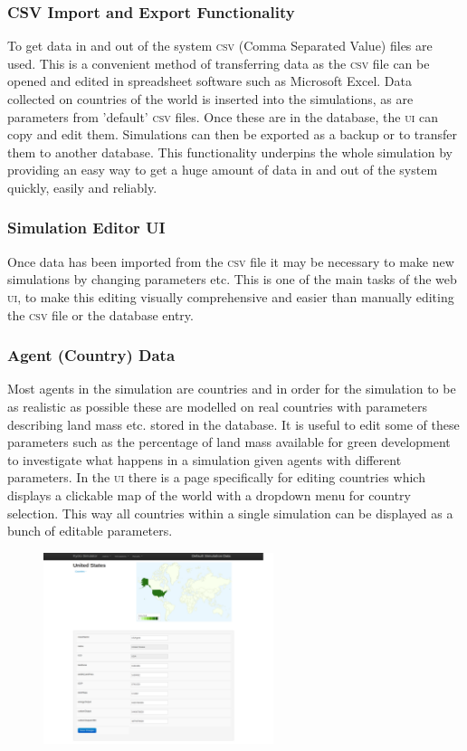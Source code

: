 {\subsubsection{CSV Import and Export Functionality}

To get data in and out of the system \textsc{csv} (Comma Separated Value) files are used. This is a convenient method of transferring data as the \textsc{csv} file can be opened and edited in spreadsheet software such as Microsoft Excel. Data collected on countries of the world is inserted into the simulations, as are parameters from 'default' \textsc{csv} files. Once these are in the database, the \textsc{ui} can copy and edit them. Simulations can then be exported as a backup or to transfer them to another database. This functionality underpins the whole simulation by providing an easy way to get a huge amount of data in and out of the system quickly, easily and reliably.

\subsubsection{Simulation Editor UI}

Once data has been imported from the \textsc{csv} file it may be necessary to make new simulations by changing parameters etc. This is one of the main tasks of the web \textsc{ui}, to make this editing visually comprehensive and easier than manually editing the \textsc{csv} file or the database entry.

\subsubsection{Agent (Country) Data}

Most agents in the simulation are countries and in order for the simulation to be as realistic as possible these are modelled on real countries with parameters describing land mass etc. stored in the database. It is useful to edit some of these parameters such as the percentage of land mass available for green development to investigate what happens in a simulation given agents with different parameters. In the \textsc{ui} there is a page specifically for editing countries which displays a clickable map of the world with a dropdown menu for country selection. This way all countries within a single simulation can be displayed as a bunch of editable parameters.

\begin{figure}[h!]
	\centering
	\includegraphics[width=0.6\textwidth]{img/ui1.png}
	\caption{}
\end{figure}

}
